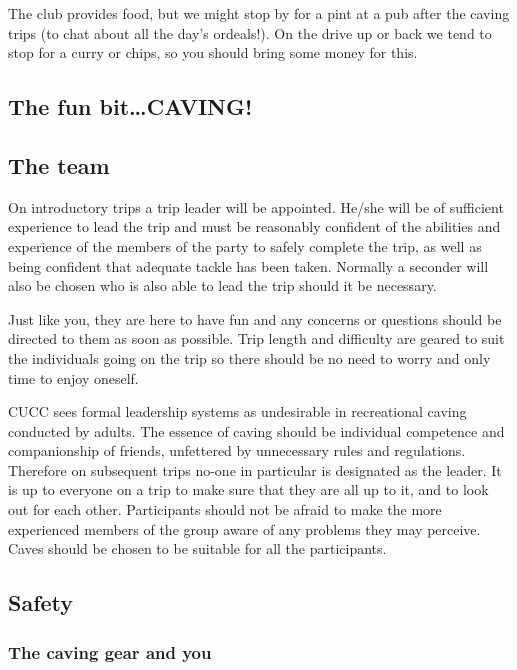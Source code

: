 \documentclass[a4paper,11pt]{article}
\begin{document}
The club provides food, but we might stop by for a pint at a pub after the
caving trips (to chat about all the day's ordeals!).  On the drive up or back
we tend to stop for a curry or chips, so you should bring some money for this.

\subsection*{The fun bit\ldots CAVING!}

\subsection*{The team}

On introductory trips a trip leader will be appointed. He/she will be of
sufficient experience to lead the trip and must be reasonably confident of the
abilities and experience of the members of the party to safely complete the
trip, as well as being confident that adequate tackle has been taken.
Normally a seconder will also be chosen who is also able to lead the trip
should it be necessary.

Just like you, they are here to have fun and any concerns or questions should be
directed to them as soon as possible.  Trip length and difficulty are geared to
suit the individuals going on the trip so there should be no need to worry and
only time to enjoy oneself.

CUCC sees formal leadership systems as undesirable in
recreational caving conducted by adults. The essence of caving should be
individual competence and companionship of friends, unfettered by unnecessary
rules and regulations.  Therefore on subsequent trips no-one in particular is
designated as the leader.  It is up to everyone on a trip to make sure that
they are all up to it, and to look out for each other.  Participants should not
be afraid to make the more experienced members of the group aware of any problems
they may perceive.  Caves should be chosen to be suitable for all the
participants.

\subsection*{Safety}

\subsubsection*{The caving gear and you}
\end{document}
